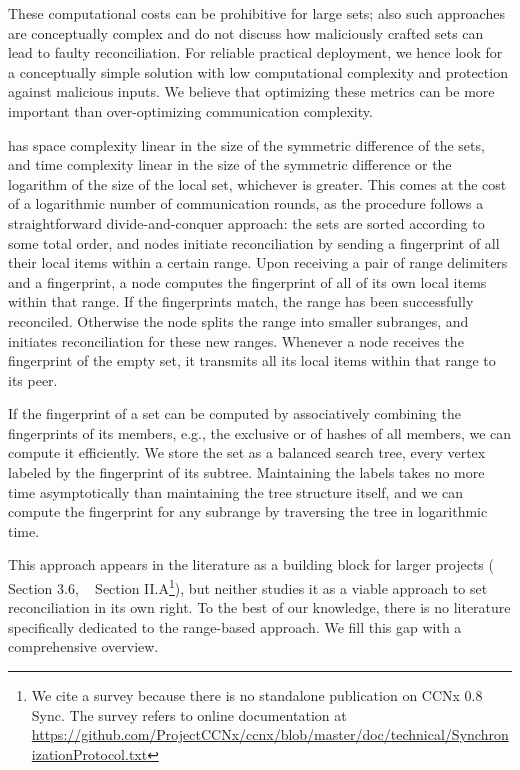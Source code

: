 \documentclass[conference]{IEEEtran}
\begin{document}
These computational costs can be prohibitive for large sets; also such approaches are conceptually complex and do not discuss how maliciously crafted sets can lead to faulty reconciliation. For reliable practical deployment, we hence look for a conceptually simple solution with low computational complexity and protection against malicious inputs. We believe that optimizing these metrics can be more important than over-optimizing communication complexity.

 has space complexity linear in the size of the symmetric difference of the sets, and time complexity linear in the size of the symmetric difference or the logarithm of the size of the local set, whichever is greater. This comes at the cost of a logarithmic number of communication rounds, as the procedure follows a straightforward divide-and-conquer approach: the sets are sorted according to some total order, and nodes initiate reconciliation by sending a fingerprint of all their local items within a certain range. Upon receiving a pair of range delimiters and a fingerprint, a node computes the fingerprint of all of its own local items within that range. If the fingerprints match, the range has been successfully reconciled. Otherwise the node splits the range into smaller subranges, and initiates reconciliation for these new ranges. Whenever a node receives the fingerprint of the empty set, it transmits all its local items within that range to its peer.

If the fingerprint of a set can be computed by associatively combining the fingerprints of its members, e.g., the exclusive or of hashes of all members, we can compute it efficiently. We store the set as a balanced search tree, every vertex labeled by the fingerprint of its subtree. Maintaining the labels takes no more time asymptotically than maintaining the tree structure itself, and we can compute the fingerprint for any subrange by traversing the tree in logarithmic time.

This approach appears in the literature as a building block for larger projects (\cite{chen1999prototype} Section 3.6, ~\cite{shang2017survey} Section II.A\footnote{We cite a survey because there is no standalone publication on CCNx 0.8 Sync. The survey refers to online documentation at \url{https://github.com/ProjectCCNx/ccnx/blob/master/doc/technical/SynchronizationProtocol.txt}}), but neither studies it as a viable approach to set reconciliation in its own right. To the best of our knowledge, there is no literature specifically dedicated to the range-based approach. We fill this gap with a comprehensive overview.
\end{document}
